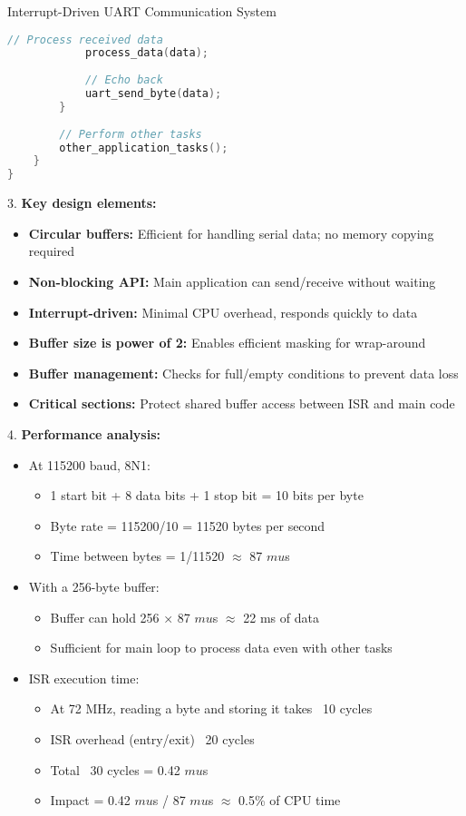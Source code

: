 \begin{example2}{Interrupt-Driven UART Communication System}
\begin{lstlisting}[language=C, style=basesmol]
            // Process received data
            process_data(data);
            
            // Echo back
            uart_send_byte(data);
        }
        
        // Perform other tasks
        other_application_tasks();
    }
}
\end{lstlisting}

3. \textbf{Key design elements:}
   \begin{itemize}
     \item \textbf{Circular buffers:} Efficient for handling serial data; no memory copying required
     \item \textbf{Non-blocking API:} Main application can send/receive without waiting
     \item \textbf{Interrupt-driven:} Minimal CPU overhead, responds quickly to data
     \item \textbf{Buffer size is power of 2:} Enables efficient masking for wrap-around
     \item \textbf{Buffer management:} Checks for full/empty conditions to prevent data loss
     \item \textbf{Critical sections:} Protect shared buffer access between ISR and main code
   \end{itemize}

4. \textbf{Performance analysis:}
   \begin{itemize}
     \item At 115200 baud, 8N1:
     \begin{itemize}
       \item 1 start bit + 8 data bits + 1 stop bit = 10 bits per byte
       \item Byte rate = 115200/10 = 11520 bytes per second
       \item Time between bytes = 1/11520 $\approx$ 87 $mu$s
     \end{itemize}
     \item With a 256-byte buffer:
     \begin{itemize}
       \item Buffer can hold 256 × 87 $mu$s $\approx$ 22 ms of data
       \item Sufficient for main loop to process data even with other tasks
     \end{itemize}
     \item ISR execution time:
     \begin{itemize}
       \item At 72 MHz, reading a byte and storing it takes ~10 cycles
       \item ISR overhead (entry/exit) ~20 cycles
       \item Total ~30 cycles = 0.42 $mu$s
       \item Impact = 0.42 $mu$s / 87 $mu$s $\approx$ 0.5\% of CPU time
     \end{itemize}
   \end{itemize}


\end{example2}
